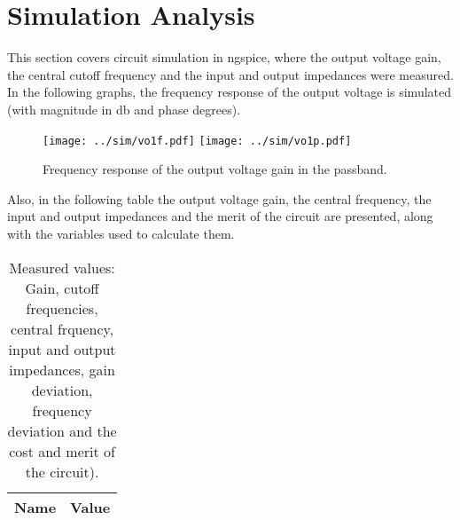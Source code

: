 \newpage
\section{Simulation Analysis}
\label{sec:simulation}
This section covers circuit simulation in ngspice, where the output voltage gain, the central cutoff frequency and the input and output impedances were measured.
\noindent In the following graphs, the frequency response of the output voltage is simulated (with magnitude in db and phase degrees).

\begin{figure}[h!] \centering
\texttt{[image: ../sim/vo1f.pdf]}
\texttt{[image: ../sim/vo1p.pdf]}
\caption{Frequency response of the output voltage gain in the passband.}
\label{fig:frequency response of the output voltage gain}
\end{figure}

\noindent Also, in the following table the output voltage gain, the central frequency, the input and output impedances and the merit of the circuit are presented, along with the variables used to calculate them.

\begin{table}[h!]
  \centering
  \begin{tabular}{|c|c|}
    \hline    
    {\bf Name} & {\bf Value} \\ \hline
    
    
  \end{tabular}
 \caption{Measured values: Gain, cutoff frequencies, central frquency, input and output impedances, gain deviation, frequency deviation and the cost and merit of the circuit).}
  \label{tab:optabs}
\end{table}




